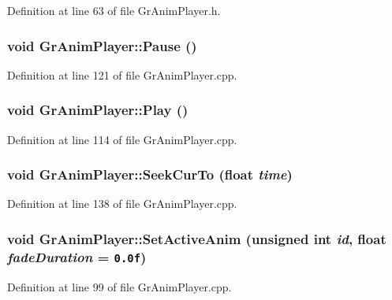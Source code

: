 \begin{CompactItemize}
Definition at line 63 of file GrAnimPlayer.h.\hypertarget{class_gr_anim_player_6a6da2d52a5f33215eaf6885b19cc8a7}{
\subsubsection[{Pause}]{\setlength{\rightskip}{0pt plus 5cm}void GrAnimPlayer::Pause ()}}
\label{class_gr_anim_player_6a6da2d52a5f33215eaf6885b19cc8a7}




Definition at line 121 of file GrAnimPlayer.cpp.\hypertarget{class_gr_anim_player_8ffa920aacb2bc0682c0b842e7c913a8}{
\subsubsection[{Play}]{\setlength{\rightskip}{0pt plus 5cm}void GrAnimPlayer::Play ()}}
\label{class_gr_anim_player_8ffa920aacb2bc0682c0b842e7c913a8}




Definition at line 114 of file GrAnimPlayer.cpp.\hypertarget{class_gr_anim_player_41f92c3573552814fb744a27f0a6259b}{
\subsubsection[{SeekCurTo}]{\setlength{\rightskip}{0pt plus 5cm}void GrAnimPlayer::SeekCurTo (float {\em time})}}
\label{class_gr_anim_player_41f92c3573552814fb744a27f0a6259b}




Definition at line 138 of file GrAnimPlayer.cpp.\hypertarget{class_gr_anim_player_20592a82ff4bd496988566edd6151c61}{
\subsubsection[{SetActiveAnim}]{\setlength{\rightskip}{0pt plus 5cm}void GrAnimPlayer::SetActiveAnim (unsigned int {\em id}, \/  float {\em fadeDuration} = {\tt 0.0f})}}
\label{class_gr_anim_player_20592a82ff4bd496988566edd6151c61}




Definition at line 99 of file GrAnimPlayer.cpp.\hypertarget{class_gr_anim_player_a4866f3c51e25c346b0eec2d5acdd0dc}{
}
\end{CompactItemize}
